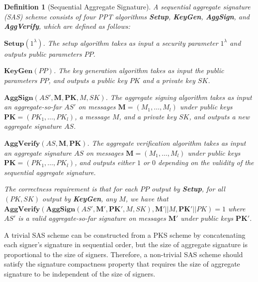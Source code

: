 \documentclass[11pt,letterpaper]{article}
\newcommand{\vect}[1]{\mathbf{#1}}
\newtheorem{definition}[theorem]{Definition}
\newcommand{\tb}[1]{\textbf{#1}}
\begin{document}
\begin{definition}[Sequential Aggregate Signature]
A sequential aggregate signature (SAS) scheme consists of four PPT algorithms
\tb{Setup}, \tb{KeyGen}, \tb{AggSign}, and \tb{AggVerify}, which are defined
as follows:
\begin{description}
\item $\tb{Setup}(1^\lambda)$. The setup algorithm takes as input a
    security parameter $1^\lambda$ and outputs public parameters $PP$.

\item $\tb{KeyGen}(PP)$. The key generation algorithm takes as input the
    public parameters $PP$, and outputs a public key $PK$ and a private key
    $SK$.

\item $\tb{AggSign}(AS', \vect{M}, \vect{PK}, M, SK)$. The aggregate
    signing algorithm takes as input an aggregate-so-far $AS'$ on messages
    $\vect{M} = (M_1, \ldots, M_l)$ under public keys $\vect{PK} = (PK_1,
    \ldots, PK_l)$, a message $M$, and a private key $SK$, and outputs a
    new aggregate signature $AS$.

\item $\tb{AggVerify}(AS, \vect{M}, \vect{PK})$. The aggregate verification
    algorithm takes as input an aggregate signature $AS$ on messages
    $\vect{M} = (M_1, \ldots, M_l)$ under public keys $\vect{PK} = (PK_1,
    \ldots, PK_l)$, and outputs either $1$ or $0$ depending on the validity
    of the sequential aggregate signature.
\end{description}
The correctness requirement is that for each $PP$ output by \tb{Setup}, for
all $(PK,SK)$ output by \tb{KeyGen}, any $M$, we have that $\tb{AggVerify}
(\tb{AggSign} (AS', \vect{M}', \vect{PK}', M, SK), \vect{M}'||M,
\vect{PK}'||PK) = 1$ where $AS'$ is a valid aggregate-so-far signature on
messages $\vect{M}'$ under public keys $\vect{PK}'$.
\end{definition}

A trivial SAS scheme can be constructed from a PKS scheme by concatenating
each signer's signature in sequential order, but the size of aggregate
signature is proportional to the size of signers. Therefore, a non-trivial
SAS scheme should satisfy the signature compactness property that requires
the size of aggregate signature to be independent of the size of signers.
\end{document}
